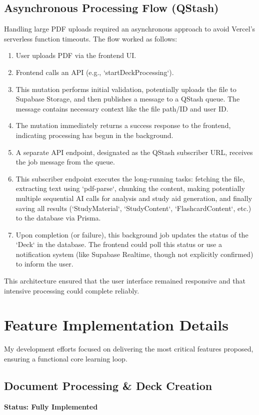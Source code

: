 \documentclass[
	letterpaper,
	11pt
]{jdf}
\begin{document}
\subsection{Asynchronous Processing Flow (QStash)}
Handling large PDF uploads required an asynchronous approach to avoid Vercel's serverless function timeouts. The flow worked as follows:
\begin{enumerate}[noitemsep, topsep=0pt]
    \item User uploads PDF via the frontend UI.
    \item Frontend calls an API (e.g., `startDeckProcessing`).
    \item This mutation performs initial validation, potentially uploads the file to Supabase Storage, and then publishes a message to a QStash queue. The message contains necessary context like the file path/ID and user ID.
    \item The mutation immediately returns a success response to the frontend, indicating processing has begun in the background.
    \item A separate API endpoint, designated as the QStash subscriber URL, receives the job message from the queue.
    \item This subscriber endpoint executes the long-running tasks: fetching the file, extracting text using `pdf-parse`, chunking the content, making potentially multiple sequential AI calls for analysis and study aid generation, and finally saving all results (`StudyMaterial`, `StudyContent`, `FlashcardContent`, etc.) to the database via Prisma.
    \item Upon completion (or failure), this background job updates the status of the `Deck` in the database. The frontend could poll this status or use a notification system (like Supabase Realtime, though not explicitly confirmed) to inform the user.
\end{enumerate}
This architecture ensured that the user interface remained responsive and that intensive processing could complete reliably.

\section{Feature Implementation Details}

My development efforts focused on delivering the most critical features proposed, ensuring a functional core learning loop.

\subsection{Document Processing \& Deck Creation}
\textbf{Status: Fully Implemented}
\end{document}
